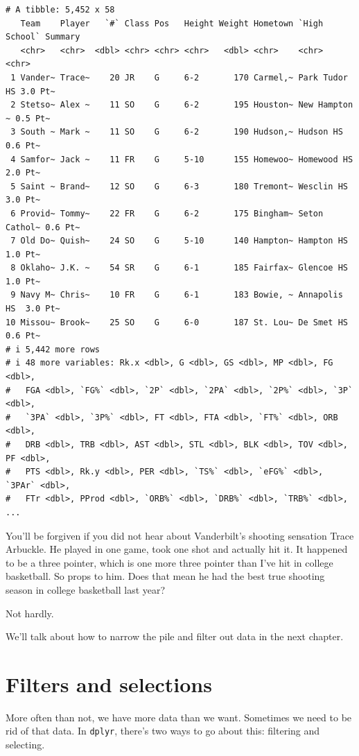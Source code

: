 \documentclass[
  letterpaper,
  DIV=11,
  numbers=noendperiod]{scrreprt}
\begin{document}
\begin{verbatim}
# A tibble: 5,452 x 58
   Team    Player   `#` Class Pos   Height Weight Hometown `High School` Summary
   <chr>   <chr>  <dbl> <chr> <chr> <chr>   <dbl> <chr>    <chr>         <chr>  
 1 Vander~ Trace~    20 JR    G     6-2       170 Carmel,~ Park Tudor HS 3.0 Pt~
 2 Stetso~ Alex ~    11 SO    G     6-2       195 Houston~ New Hampton ~ 0.5 Pt~
 3 South ~ Mark ~    11 SO    G     6-2       190 Hudson,~ Hudson HS     0.6 Pt~
 4 Samfor~ Jack ~    11 FR    G     5-10      155 Homewoo~ Homewood HS   2.0 Pt~
 5 Saint ~ Brand~    12 SO    G     6-3       180 Tremont~ Wesclin HS    3.0 Pt~
 6 Provid~ Tommy~    22 FR    G     6-2       175 Bingham~ Seton Cathol~ 0.6 Pt~
 7 Old Do~ Quish~    24 SO    G     5-10      140 Hampton~ Hampton HS    1.0 Pt~
 8 Oklaho~ J.K. ~    54 SR    G     6-1       185 Fairfax~ Glencoe HS    1.0 Pt~
 9 Navy M~ Chris~    10 FR    G     6-1       183 Bowie, ~ Annapolis HS  3.0 Pt~
10 Missou~ Brook~    25 SO    G     6-0       187 St. Lou~ De Smet HS    0.6 Pt~
# i 5,442 more rows
# i 48 more variables: Rk.x <dbl>, G <dbl>, GS <dbl>, MP <dbl>, FG <dbl>,
#   FGA <dbl>, `FG%` <dbl>, `2P` <dbl>, `2PA` <dbl>, `2P%` <dbl>, `3P` <dbl>,
#   `3PA` <dbl>, `3P%` <dbl>, FT <dbl>, FTA <dbl>, `FT%` <dbl>, ORB <dbl>,
#   DRB <dbl>, TRB <dbl>, AST <dbl>, STL <dbl>, BLK <dbl>, TOV <dbl>, PF <dbl>,
#   PTS <dbl>, Rk.y <dbl>, PER <dbl>, `TS%` <dbl>, `eFG%` <dbl>, `3PAr` <dbl>,
#   FTr <dbl>, PProd <dbl>, `ORB%` <dbl>, `DRB%` <dbl>, `TRB%` <dbl>, ...
\end{verbatim}

You'll be forgiven if you did not hear about Vanderbilt's shooting
sensation Trace Arbuckle. He played in one game, took one shot and
actually hit it. It happened to be a three pointer, which is one more
three pointer than I've hit in college basketball. So props to him. Does
that mean he had the best true shooting season in college basketball
last year?

Not hardly.

We'll talk about how to narrow the pile and filter out data in the next
chapter.


\hypertarget{filters-and-selections}{%
\chapter{Filters and selections}\label{filters-and-selections}}

More often than not, we have more data than we want. Sometimes we need
to be rid of that data. In \texttt{dplyr}, there's two ways to go about
this: filtering and selecting.
\end{document}
